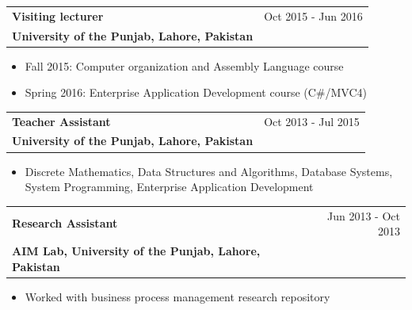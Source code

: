 \begin{tabularx}{\linewidth}{@{}X r@{}}
    \textbf{Visiting lecturer} & Oct 2015 - Jun 2016 \\[3.75pt]
    \textbf{University of the Punjab, Lahore, Pakistan} &
\end{tabularx}\nopagebreak
\vspace{\glueexpr -\parskip + 2pt\relax}
\begin{itemize}[nosep,after=\strut, leftmargin=1em, itemsep=3pt]
    \item[--] Fall 2015: Computer organization and Assembly Language course
    \item[--] Spring 2016: Enterprise Application Development course (C\#/MVC4)
\end{itemize}

\begin{tabularx}{\linewidth}{@{}X r@{}}
    \textbf{Teacher Assistant} & Oct 2013 - Jul 2015 \\[3.75pt]
    \textbf{University of the Punjab, Lahore, Pakistan} &
\end{tabularx}\nopagebreak
\vspace{\glueexpr -\parskip + 2pt\relax}
\begin{itemize}[nosep,after=\strut, leftmargin=1em, itemsep=3pt]
    \item[--] Discrete Mathematics, Data Structures and Algorithms, Database Systems, System Programming, Enterprise Application Development
\end{itemize}

\begin{tabularx}{\linewidth}{@{}X r@{}}
    \textbf{Research Assistant} & Jun 2013 - Oct 2013 \\[3.75pt]
    \textbf{AIM Lab, University of the Punjab, Lahore, Pakistan} &
\end{tabularx}\nopagebreak
\vspace{\glueexpr -\parskip + 2pt\relax}
\begin{itemize}[nosep,after=\strut, leftmargin=1em, itemsep=3pt]
    \item[--] Worked with business process management research repository
\end{itemize}
